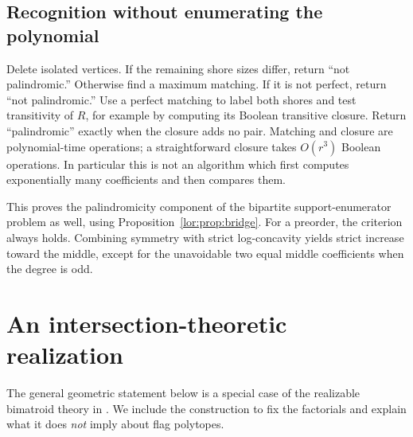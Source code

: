 \documentclass[11pt]{article}
\numberwithin{equation}{section}
\theoremstyle{definition}
\begin{document}
\subsection{Recognition without enumerating the polynomial}
Delete isolated vertices. If the remaining shore sizes differ, return ``not
palindromic.'' Otherwise find a maximum matching. If it is not perfect, return
``not palindromic.'' Use a perfect matching to label both shores and test
transitivity of $R$, for example by computing its Boolean transitive closure.
Return ``palindromic'' exactly when the closure adds no pair. Matching and
closure are polynomial-time operations; a straightforward closure takes
$O(r^3)$ Boolean operations. In particular this is not an algorithm which
first computes exponentially many coefficients and then compares them.

This proves the palindromicity component of the bipartite support-enumerator
problem as well, using Proposition~\ref{lor:prop:bridge}. For a preorder, the criterion always
holds. Combining symmetry with strict log-concavity yields strict increase
toward the middle, except for the unavoidable two equal middle coefficients
when the degree is odd.

\section{An intersection-theoretic realization}
\label{lor:sp:sec:geometry}

The general geometric statement below is a special case of the realizable
bimatroid theory in \cite[Theorem E]{RU}. We include the construction to fix the
factorials and explain what it does \emph{not} imply about flag polytopes.
\end{document}
